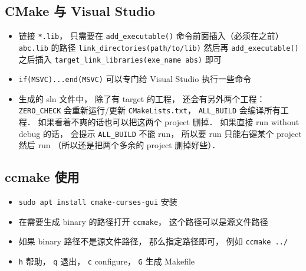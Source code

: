 \subsection{CMake 与 Visual Studio}
\begin{itemize}
\item 链接 \verb`*.lib`， 只需要在 \verb`add_executable()` 命令前面插入（必须在之前） \verb`abc.lib` 的路径 \verb`link_directories(path/to/lib)` 然后再 \verb`add_executable()` 之后插入 \verb`target_link_libraries(exe_name abs)` 即可
\item \verb`if(MSVC)...end(MSVC)` 可以专门给 Visual Studio 执行一些命令
\item 生成的 sln 文件中， 除了有 target 的工程， 还会有另外两个工程： \verb`ZERO_CHECK` 会重新运行/更新 \verb`CMakeLists.txt`， \verb`ALL_BUILD` 会编译所有工程． 如果看着不爽的话也可以把这两个 project 删掉． 如果直接 run without debug 的话， 会提示 \verb`ALL_BUILD` 不能 run， 所以要 run 只能右键某个 project 然后 run （所以还是把两个多余的 project 删掉好些）．
\end{itemize}

\subsection{ccmake 使用}
\begin{itemize}
\item \verb`sudo apt install cmake-curses-gui` 安装
\item 在需要生成 binary 的路径打开 \verb`ccmake`， 这个路径可以是源文件路径
\item 如果 binary 路径不是源文件路径， 那么指定路径即可， 例如 \verb`ccmake ../`
\item \verb`h` 帮助， \verb`q` 退出， \verb`c` configure， \verb`G` 生成 Makefile
\end{itemize}
